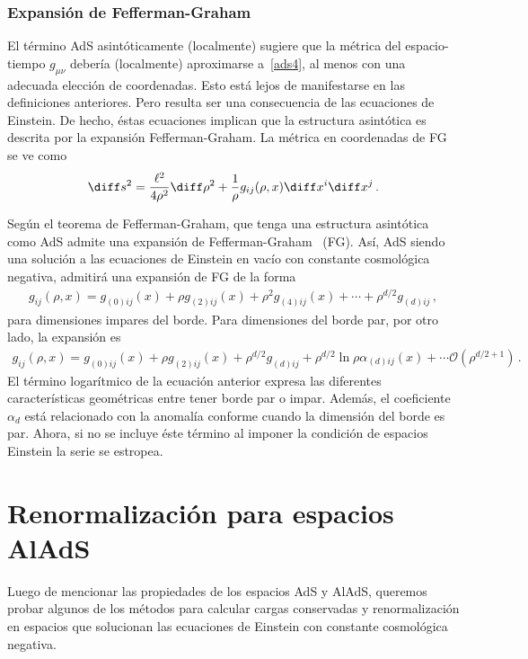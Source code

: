\documentclass[../Main.tex]{subfiles}
\begin{document}
\subsubsection{Expansión de Fefferman-Graham}
El término AdS asintóticamente (localmente) sugiere que la métrica del espacio-tiempo $g_{\mu\nu}$ debería (localmente) aproximarse a~\eqref{ads4}, al menos con una adecuada elección de coordenadas. Esto está lejos de manifestarse en las definiciones anteriores. Pero resulta ser una consecuencia de las ecuaciones de Einstein. De hecho, éstas ecuaciones implican que la estructura asintótica es descrita por 
la expansión Fefferman-Graham. La métrica en coordenadas de FG se ve como 
\begin{align}
\diff s^2=\frac{\ell^2}{4\rho^2}\diff\rho^2+\frac{1}{\rho}g_{ij}(\rho,x)\diff x^{i}\diff x^{j}\, .
\end{align}

 
Según el teorema de Fefferman-Graham, que tenga una estructura asintótica como AdS admite una expansión de Fefferman-Graham~\cite{fefferman2008ambient} (FG). Así, AdS siendo una solución a las ecuaciones de Einstein en vacío con constante cosmológica negativa, admitirá una expansión de FG de la forma
\begin{align}
g_{ij}(\rho,x)=g_{(0)ij}(x)+\rho g_{(2)ij}(x)+\rho^{2}g_{(4)ij}(x)+\cdots+\rho^{d/2}g_{(d)ij}    \, ,
\end{align}
para dimensiones impares del borde. Para dimensiones del borde par, por otro lado, la expansión es
\begin{align}
g_{ij}(\rho,x)=g_{(0)ij}(x)+\rho g_{(2)ij}(x)+\rho^{d/2}g_{(d)ij}+\rho^{d/2}\ln{\rho}\alpha_{(d)ij}(x)+\cdots\mathcal{O}(\rho^{d/2 +1})\, .
\end{align}
El término logarítmico de la ecuación anterior expresa las diferentes características geométricas entre tener borde par o impar. Además, el coeficiente $\alpha_{d}$ está relacionado con la anomalía conforme cuando la dimensión del borde es par. Ahora, si no se incluye éste término al imponer la condición de espacios Einstein la serie se estropea.  

\section{Renormalización para espacios AlAdS}
Luego de mencionar las propiedades de los espacios AdS y AlAdS, queremos probar algunos de los métodos para calcular cargas conservadas y renormalización en espacios que solucionan las ecuaciones de Einstein con constante cosmológica negativa. 
\end{document}
